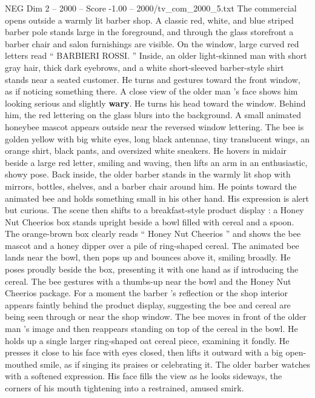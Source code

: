 \begin{textsample}{NEG Dim 2 – 2000 – Score -1.00 – 2000/tv\_com\_2000\_5.txt}  \label{ex:f2_neg_075}
The commercial opens outside a warmly lit barber shop.
A classic red, white, and blue striped barber pole stands large in the foreground, and through the glass storefront a barber chair and salon furnishings are visible.
On the window, large curved red letters read “ BARBIERI ROSSI. ” Inside, an older light-skinned man with short gray hair, thick dark eyebrows, and a white short-sleeved barber-style shirt stands near a seated customer.
He turns and gestures toward the front window, as if noticing something there.
A close view of the older man ’s face shows him looking serious and slightly \textbf{wary}.
He turns his head toward the window.
Behind him, the red lettering on the glass blurs into the background.
A small animated honeybee mascot appears outside near the reversed window lettering.
The bee is golden yellow with big white eyes, long black antennae, tiny translucent wings, an orange shirt, black pants, and oversized white sneakers.
He hovers in midair beside a large red letter, smiling and waving, then lifts an arm in an enthusiastic, showy pose.
Back inside, the older barber stands in the warmly lit shop with mirrors, bottles, shelves, and a barber chair around him.
He points toward the animated bee and holds something small in his other hand.
His expression is alert but curious.
The scene then shifts to a breakfast-style product display : a Honey Nut Cheerios box stands upright beside a bowl filled with cereal and a spoon.
The orange-brown box clearly reads “ Honey Nut Cheerios ” and shows the bee mascot and a honey dipper over a pile of ring-shaped cereal.
The animated bee lands near the bowl, then pops up and bounces above it, smiling broadly.
He poses proudly beside the box, presenting it with one hand as if introducing the cereal.
The bee gestures with a thumbs-up near the bowl and the Honey Nut Cheerios package.
For a moment the barber ’s reflection or the shop interior appears faintly behind the product display, suggesting the bee and cereal are being seen through or near the shop window.
The bee moves in front of the older man ’s image and then reappears standing on top of the cereal in the bowl.
He holds up a single larger ring-shaped oat cereal piece, examining it fondly.
He presses it close to his face with eyes closed, then lifts it outward with a big open-mouthed smile, as if singing its praises or celebrating it.
The older barber watches with a softened expression.
His face fills the view as he looks sideways, the corners of his mouth tightening into a restrained, amused smirk.

\end{textsample}
